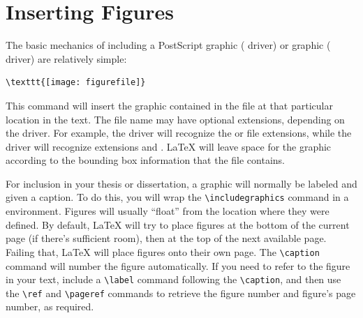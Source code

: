 \section{Inserting Figures}
The basic mechanics of including a PostScript graphic (
driver) or  graphic ( driver) are relatively
simple:
\begin{verbatim}
\texttt{[image: figurefile]}
\end{verbatim}
This command will insert the graphic contained in the file
 at that particular location in the text.  The file
name may have optional extensions, depending on the driver.  For
example, the  driver will recognize the  or
 file extensions, while the  driver will
recognize extensions  and .  \LaTeX{} will leave
space for the graphic according to the bounding box information that
the file contains.

For inclusion in your thesis or dissertation, a graphic will normally
be labeled and given a caption.  To do this, you will wrap the
\verb|\includegraphics| command in a  environment.
Figures will usually ``float'' from the location where they were
defined.  By default, \LaTeX{} will try to place figures at the bottom
of the current page (if there's sufficient room), then at the top of
the next available page.  Failing that, \LaTeX{} will place figures
onto their own page.  The \verb|\caption| command will number the
figure automatically.  If you need to refer to the figure in your
text, include a \verb|\label| command following the \verb|\caption|,
and then use the \verb|\ref| and \verb|\pageref| commands to
retrieve the figure number and figure's page number, as required.

